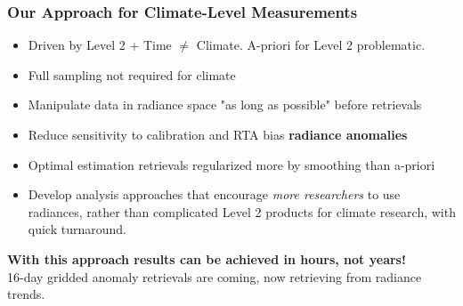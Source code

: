 \documentclass[10pt,t]{beamer}
\begin{document}
\begin{frame}
\frametitle{Our Approach for Climate-Level Measurements}  
\vspace{-0.1in}
\begin{itemize}
\item Driven by Level 2 + Time \(\neq\) Climate.  A-priori for Level 2 problematic.
\item Full sampling not required for climate
\item Manipulate data in radiance space "as long as possible" before retrievals
\item Reduce sensitivity to calibration and RTA bias \textbf{radiance anomalies}
\item Optimal estimation retrievals regularized more by smoothing than a-priori
\item Develop analysis approaches that encourage \emph{more researchers} to use radiances, rather than complicated Level 2 products for climate research, with quick turnaround.
\end{itemize}

\textbf{With this approach results can be achieved in hours, not years!}   \\

\vspace{0.1in}
16-day gridded anomaly retrievals are coming, now retrieving from radiance trends.
\end{frame}
\end{document}
